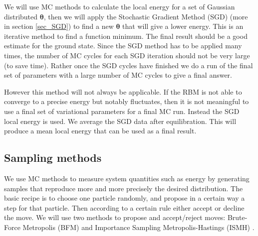 
We will use MC methods to calculate the local energy for a set of Gaussian distributed $\boldsymbol{\theta}$, then we will apply the Stochastic Gradient Method (SGD) (more in section \ref{sec_SGD}) to find a new $\boldsymbol{\theta}$ that will give a lower energy. This is an iterative method to find a function minimum. The final result should be a good estimate for the ground state. Since the SGD method has to be applied many times, the number of MC cycles for each SGD iteration should not be very large (to save time). Rather once the SGD cycles have finished we do a run of the final set of parameters with a large number of MC cycles to give a final answer.

However this method will not always be applicable. If the RBM is not able to converge to a precise energy but notably fluctuates, then it is not meaningful to use a final set of variational parameters for a final MC run. Instead the SGD local energy is used. We average the SGD data after equilibration. This will produce a mean local energy that can be used as a final result.

\subsection{Sampling methods}
We use MC methods to measure system quantities such as energy by generating samples that reproduce more and more precisely the desired distribution. The basic recipe is to choose one particle randomly, and propose in a certain way a step for that particle. Then according to a certain rule either accept or decline the move. We will use two methods to propose and accept/reject moves: Brute-Force Metropolis (BFM) and Importance Sampling Metropolis-Hastings (ISMH) \cite{morten_book}. 

